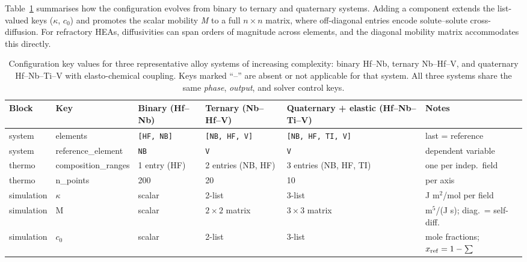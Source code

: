 \documentclass[12pt]{article}
\begin{document}
Table~\ref{tab:config} summarises how the configuration evolves from binary to ternary and quaternary systems. Adding a component extends the list-valued keys ($\kappa$, $c_0$) and promotes the scalar mobility \emph{M} to a full $n{\times}n$ matrix, where off-diagonal entries encode solute--solute cross-diffusion. For refractory HEAs, diffusivities can span orders of magnitude across elements, and the diagonal mobility matrix accommodates this directly.

\begin{table}[!h]
\centering
\caption{Configuration key values for three representative alloy systems of increasing complexity: binary Hf--Nb, ternary Nb--Hf--V, and quaternary Hf--Nb--Ti--V with elasto-chemical coupling. Keys marked ``--'' are absent or not applicable for that system. All three systems share the same \emph{phase}, \emph{output}, and solver control keys.}
\label{tab:config}
\scriptsize
\begin{tabular}{@{}ll p{2.0cm} p{2.2cm} p{2.8cm} p{3.8cm}@{}}
\toprule
\textbf{Block} & \textbf{Key} & \textbf{Binary (Hf--Nb)} & \textbf{Ternary (Nb--Hf--V)} & \textbf{Quaternary + elastic (Hf--Nb--Ti--V)} & \textbf{Notes} \\
\midrule
system  & elements            & \texttt{[HF, NB]}        & \texttt{[NB, HF, V]}          & \texttt{[NB, HF, TI, V]}         & last = reference \\
system  & reference\_element  & \texttt{NB}              & \texttt{V}                    & \texttt{V}                       & dependent variable \\
\midrule
thermo  & composition\_ranges & 1 entry (HF)             & 2 entries (NB, HF)            & 3 entries (NB, HF, TI)           & one per indep.\ field \\
thermo  & n\_points           & 200                      & 20                            & 10                               & per axis \\
\midrule
simulation & $\kappa$          & scalar                   & 2-list                        & 3-list                           & J m$^2$/mol per field \\
simulation & M                & scalar                   & $2{\times}2$ matrix           & $3{\times}3$ matrix              & m$^5$/(J s); diag.\ = self-diff. \\
simulation & $c_0$            & scalar                   & 2-list                        & 3-list                           & mole fractions; $x_{\rm ref} = 1 - \sum$ \\

\end{tabular}
\end{table}
\end{document}
